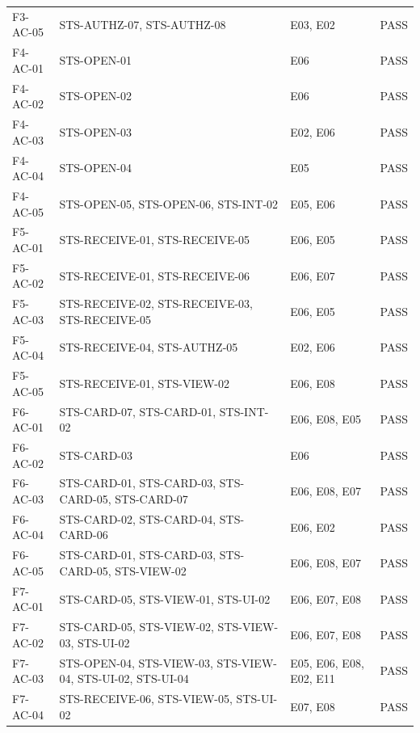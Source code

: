 \begin{longtable}{@{}>{\raggedright\arraybackslash}p{}>{\raggedright\arraybackslash}p{}>{\raggedright\arraybackslash}p{}>{\raggedright\arraybackslash}p{}@{}}
\mbox{F3-AC-05} & \mbox{STS-AUTHZ-07}, \mbox{STS-AUTHZ-08} & E03, E02 & PASS \\
\mbox{F4-AC-01} & \mbox{STS-OPEN-01} & E06 & PASS \\
\mbox{F4-AC-02} & \mbox{STS-OPEN-02} & E06 & PASS \\
\mbox{F4-AC-03} & \mbox{STS-OPEN-03} & E02, E06 & PASS \\
\mbox{F4-AC-04} & \mbox{STS-OPEN-04} & E05 & PASS \\
\mbox{F4-AC-05} & \mbox{STS-OPEN-05}, \mbox{STS-OPEN-06}, \mbox{STS-INT-02} & E05, E06 & PASS \\
\mbox{F5-AC-01} & \mbox{STS-RECEIVE-01}, \mbox{STS-RECEIVE-05} & E06, E05 & PASS \\
\mbox{F5-AC-02} & \mbox{STS-RECEIVE-01}, \mbox{STS-RECEIVE-06} & E06, E07 & PASS \\
\mbox{F5-AC-03} & \mbox{STS-RECEIVE-02}, \mbox{STS-RECEIVE-03}, \mbox{STS-RECEIVE-05} & E06, E05 & PASS \\
\mbox{F5-AC-04} & \mbox{STS-RECEIVE-04}, \mbox{STS-AUTHZ-05} & E02, E06 & PASS \\
\mbox{F5-AC-05} & \mbox{STS-RECEIVE-01}, \mbox{STS-VIEW-02} & E06, E08 & PASS \\
\mbox{F6-AC-01} & \mbox{STS-CARD-07}, \mbox{STS-CARD-01}, \mbox{STS-INT-02} & E06, E08, E05 & PASS \\
\mbox{F6-AC-02} & \mbox{STS-CARD-03} & E06 & PASS \\
\mbox{F6-AC-03} & \mbox{STS-CARD-01}, \mbox{STS-CARD-03}, \mbox{STS-CARD-05}, \mbox{STS-CARD-07} & E06, E08, E07 & PASS \\
\mbox{F6-AC-04} & \mbox{STS-CARD-02}, \mbox{STS-CARD-04}, \mbox{STS-CARD-06} & E06, E02 & PASS \\
\mbox{F6-AC-05} & \mbox{STS-CARD-01}, \mbox{STS-CARD-03}, \mbox{STS-CARD-05}, \mbox{STS-VIEW-02} & E06, E08, E07 & PASS \\
\mbox{F7-AC-01} & \mbox{STS-CARD-05}, \mbox{STS-VIEW-01}, \mbox{STS-UI-02} & E06, E07, E08 & PASS \\
\mbox{F7-AC-02} & \mbox{STS-CARD-05}, \mbox{STS-VIEW-02}, \mbox{STS-VIEW-03}, \mbox{STS-UI-02} & E06, E07, E08 & PASS \\
\mbox{F7-AC-03} & \mbox{STS-OPEN-04}, \mbox{STS-VIEW-03}, \mbox{STS-VIEW-04}, \mbox{STS-UI-02}, \mbox{STS-UI-04} & E05, E06, E08, E02, E11 & PASS \\
\mbox{F7-AC-04} & \mbox{STS-RECEIVE-06}, \mbox{STS-VIEW-05}, \mbox{STS-UI-02} & E07, E08 & PASS \\

\end{longtable}

